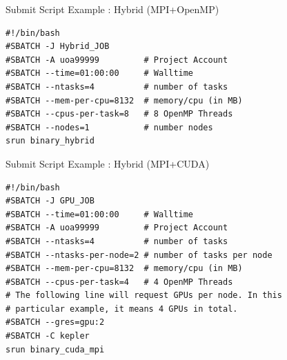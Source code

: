 \documentclass[final,t]{beamer}
\begin{document}
\begin{frame}[fragile]{}
\begin{columns}[t]
\begin{column}{.3\linewidth}
      \begin{block}{Submit Script Example : Hybrid (MPI+OpenMP)}
              \vspace*{-3ex}
        \begin{verbatim}
#!/bin/bash
#SBATCH -J Hybrid_JOB
#SBATCH -A uoa99999         # Project Account
#SBATCH --time=01:00:00     # Walltime
#SBATCH --ntasks=4          # number of tasks
#SBATCH --mem-per-cpu=8132  # memory/cpu (in MB)
#SBATCH --cpus-per-task=8   # 8 OpenMP Threads
#SBATCH --nodes=1           # number nodes
srun binary_hybrid
        \end{verbatim}
                \vspace*{-4ex}
      \end{block}

      \begin{block}{Submit Script Example : Hybrid (MPI+CUDA)}
              \vspace*{-3ex}
        \begin{verbatim}
#!/bin/bash
#SBATCH -J GPU_JOB
#SBATCH --time=01:00:00     # Walltime
#SBATCH -A uoa99999         # Project Account
#SBATCH --ntasks=4          # number of tasks
#SBATCH --ntasks-per-node=2 # number of tasks per node
#SBATCH --mem-per-cpu=8132  # memory/cpu (in MB)
#SBATCH --cpus-per-task=4   # 4 OpenMP Threads
# The following line will request GPUs per node. In this  
# particular example, it means 4 GPUs in total.
#SBATCH --gres=gpu:2       
#SBATCH -C kepler
srun binary_cuda_mpi
        \end{verbatim}
                \vspace*{-4ex}
      \end{block}


    \end{column}

    
    \begin{column}{.35\linewidth}
    

\end{column}
\end{columns}
\end{frame}
\end{document}
